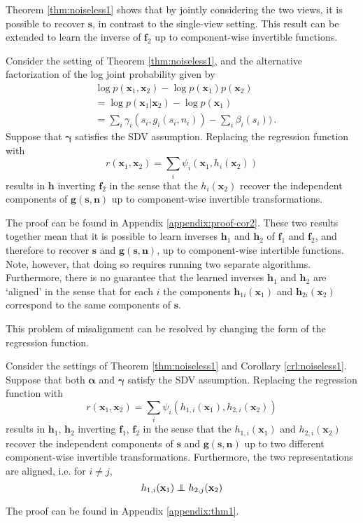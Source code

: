 Theorem \ref{thm:noiseless1} shows that by jointly considering the two views, it is possible to recover $\bm{s}$, in contrast to the single-view setting.
This result can be extended to learn the inverse of $\bm{f}_2$ up to component-wise invertible functions.
\begin{corollary}
\label{crl:noiseless1}
Consider the setting of Theorem \ref{thm:noiseless1}, and the alternative factorization of the log joint probability given by
\begin{align}
&\log p(\bm{x}_1, \bm{x}_2) - \log p(\bm{x}_1) p(\bm{x}_2) \nonumber \\
&= \log p(\bm{x}_1 | \bm{x}_2) - \log p(\bm{x}_1)\nonumber \\
&= \sum_i \gamma_i(s_{i}, g_i(s_i, n_i)) - \sum_i \beta_i(s_i)) \label{eq:logdens_noiesless_2}\,.
\end{align}
Suppose that $\bm{\gamma}$ satisfies the SDV assumption.
Replacing the regression function with
\begin{equation*}
r(\bm{x}_{1},\bm{x}_{2})=\sum_{i}\psi_{i}(\bm{x}_{1}, h_{i}(\bm{x}_{2}))
\end{equation*}
results in $\bm{h}$ inverting $\bm{f}_2$ in the sense that the $h_{i}(\bm{x}_2)$ recover the independent components of $\bm{g}(\bm{s}, \bm{n})$ up  to component-wise invertible transformations.
\end{corollary}The proof can be found in Appendix \ref{appendix:proof-cor2}.
These two results together mean that it is possible to learn inverses $\bm{h}_1$ and $\bm{h}_2$ of $\bm{f}_1$ and $\bm{f}_2$, and therefore to recover $\bm{s}$ and $\bm{g}(\bm{s}, \bm{n})$, up to component-wise intertible functions.
Note, however, that doing so requires running two separate algorithms.
Furthermore, there is no guarantee that the learned inverses $\bm{h}_1$ and $\bm{h}_2$ are `aligned' in the sense that for each $i$ the components $\bm{h}_{1i}(\bm{x}_1)$ and $\bm{h}_{2i}(\bm{x}_2)$ correspond to the same components of $\bm{s}$.

This problem of misalignment can be resolved by changing the form of the regression function.

\begin{theorem}\label{thm:demixing}
Consider the settings of Theorem \ref{thm:noiseless1} and Corollary \ref{crl:noiseless1}.
Suppose that both $\bm{\alpha}$ and $\bm{\gamma}$ satisfy the SDV assumption.
Replacing the regression function with
\begin{equation}\label{eqn:double-regression-fn}
r(\bm{x}_{1},\bm{x}_{2})=\sum_{i}\psi_{i}(h_{1,i}(\bm{x}_{1}),h_{2,i}(\bm{x}_{2}))
\end{equation}
results in $\bm{h}_1$, $\bm{h}_2$ inverting $\bm{f}_1$, $\bm{f}_2$ in the sense that the $h_{1,i}(\bm{x}_1)$ and $h_{2,i}(\bm{x}_2)$ recover the independent components of $\bm{s}$ and $\bm{g}(\bm{s}, \bm{n})$ up to two different component-wise invertible transformations. Furthermore, the two representations are aligned, i.e. for $i\not=j$,
\begin{equation*}
    h_{1,i}(\mathbf{x}_{1})\independent h_{2,j}(\mathbf{x}_{2})
\end{equation*}
\end{theorem}
The proof can be found in Appendix \ref{appendix:thm1}.

